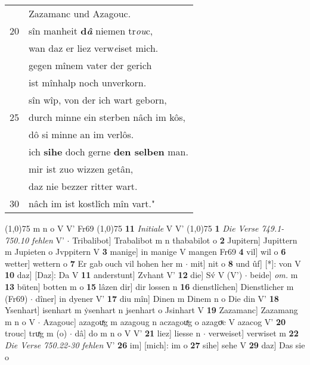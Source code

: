 \documentclass[8pt,a4paper,notitlepage]{article}
\begin{document}
\begin{table}[ht]
\begin{minipage}[t]{0.5\linewidth}
\begin{tabular}{rl}
 & Zazamanc und Azagouc.\\ 
20 & sîn manheit \textbf{d\textit{â}} niemen tr\textit{ou}c,\\ 
 & wan daz er liez verw\textit{e}iset mich.\\ 
 & gegen mînem vater der gerich\\ 
 & ist mînhalp noch unverkorn.\\ 
 & sîn wîp, von der ich wart geborn,\\ 
25 & durch minne ein sterben nâch im kôs,\\ 
 & dô si minne an im verlôs.\\ 
 & ich \textbf{sihe} doch gerne \textbf{den selben} man.\\ 
 & mir ist zuo wizzen getân,\\ 
 & daz nie bezzer ritter wart.\\ 
30 & nâch im ist kostlîch mîn vart."\\ 
\end{tabular}
\scriptsize
\line(1,0){75} \newline
m n o V V' Fr69 \newline
\line(1,0){75} \newline
\textbf{11} \textit{Initiale} V V'  \newline
\line(1,0){75} \newline
\textbf{1} \textit{Die Verse 749.1-750.10 fehlen} V'   $\cdot$ Tribalibot] Trabalibot m n thababilot o \textbf{2} Jupitern] Jupittern m Jupieten o Jvppitern V \textbf{3} manige] in manige V mangen Fr69 \textbf{4} vil] wil o \textbf{6} wetter] wettern o \textbf{7} Er gab ouch vil hohen her m  $\cdot$ mit] nit o \textbf{8} und ûf] [*]: von V \textbf{10} daz] [Daz]: Da V \textbf{11} anderstunt] Zvhant V' \textbf{12} die] Sv́ V (V')  $\cdot$ beide] \textit{om.} m \textbf{13} büten] botten m o \textbf{15} lâzen dir] dir lossen n \textbf{16} dienstlîchen] Dienstlicher m (Fr69)  $\cdot$ dîner] in dyener V' \textbf{17} diu mîn] Dinen m Dinem n o Die din V' \textbf{18} Ysenhart] isenhart m ẏsenhart n jsenhart o Jsinhart V \textbf{19} Zazamanc] Zazamang m n o V  $\cdot$ Azagouc] azagouͯg m azagoug n aczagouͯg o azagoͮc V azacog V' \textbf{20} trouc] truͯg m (o)  $\cdot$ dâ] do m n o V V' \textbf{21} liez] liesse n  $\cdot$ verweiset] verwiset m \textbf{22} \textit{Die Verse 750.22-30 fehlen} V'  \textbf{26} im] [mich]: im o \textbf{27} sihe] sehe V \textbf{29} daz] Das sie o \newline
\end{minipage}
\end{table}
\end{document}
